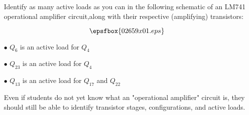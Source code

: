 

Identify as many active loads as you can in the following schematic of an LM741 operational amplifier circuit,along with their respective (amplifying) transistors:

$$\epsfbox{02659x01.eps}$$







\medskip
\goodbreak
\item{$\bullet$} $Q_6$ is an active load for $Q_4$
\item{$\bullet$} $Q_{23}$ is an active load for $Q_4$
\item{$\bullet$} $Q_{13}$ is an active load for $Q_{17}$ and $Q_{22}$
\medskip







Even if students do not yet know what an "operational amplifier" circuit is, they should still be able to identify transistor stages, configurations, and active loads.




